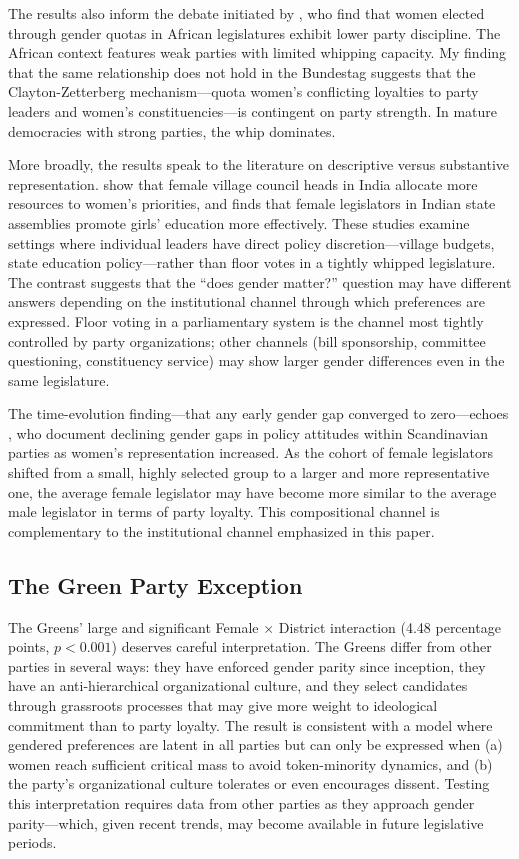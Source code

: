 \documentclass[12pt]{article}
\begin{document}
The results also inform the debate initiated by \citet{clayton2021}, who find that women elected through gender quotas in African legislatures exhibit lower party discipline. The African context features weak parties with limited whipping capacity. My finding that the same relationship does not hold in the Bundestag suggests that the Clayton-Zetterberg mechanism---quota women's conflicting loyalties to party leaders and women's constituencies---is contingent on party strength. In mature democracies with strong parties, the whip dominates.

More broadly, the results speak to the literature on descriptive versus substantive representation. \citet{chattopadhyay2004} show that female village council heads in India allocate more resources to women's priorities, and \citet{clots2012} finds that female legislators in Indian state assemblies promote girls' education more effectively. These studies examine settings where individual leaders have direct policy discretion---village budgets, state education policy---rather than floor votes in a tightly whipped legislature. The contrast suggests that the ``does gender matter?'' question may have different answers depending on the institutional channel through which preferences are expressed. Floor voting in a parliamentary system is the channel most tightly controlled by party organizations; other channels (bill sponsorship, committee questioning, constituency service) may show larger gender differences even in the same legislature.

The time-evolution finding---that any early gender gap converged to zero---echoes \citet{heidar2006}, who document declining gender gaps in policy attitudes within Scandinavian parties as women's representation increased. As the cohort of female legislators shifted from a small, highly selected group to a larger and more representative one, the average female legislator may have become more similar to the average male legislator in terms of party loyalty. This compositional channel is complementary to the institutional channel emphasized in this paper.

\subsection{The Green Party Exception}

The Greens' large and significant Female $\times$ District interaction (4.48 percentage points, $p < 0.001$) deserves careful interpretation. The Greens differ from other parties in several ways: they have enforced gender parity since inception, they have an anti-hierarchical organizational culture, and they select candidates through grassroots processes that may give more weight to ideological commitment than to party loyalty. The result is consistent with a model where gendered preferences are latent in all parties but can only be expressed when (a) women reach sufficient critical mass to avoid token-minority dynamics, and (b) the party's organizational culture tolerates or even encourages dissent. Testing this interpretation requires data from other parties as they approach gender parity---which, given recent trends, may become available in future legislative periods.
\end{document}
